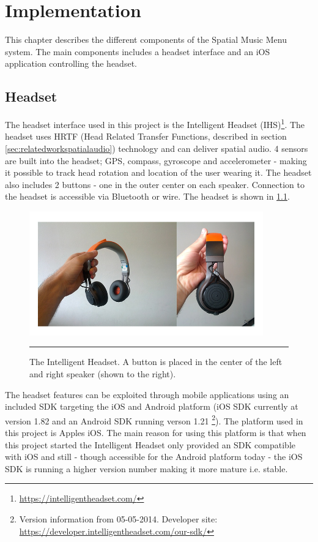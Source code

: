 \chapter{Implementation}
This chapter describes the different components of the Spatial Music Menu system. The main components includes a headset interface and an iOS application controlling the headset.


\section{Headset}
\label{sec:implementationheadset}
The headset interface used in this project is the Intelligent Headset (IHS)\footnote{\url{https://intelligentheadset.com/}}. The headset uses HRTF (Head Related Transfer Functions, described in section \ref{sec:relatedworkspatialaudio}) technology and can deliver spatial audio. 4 sensors are built into the headset; GPS, compass, gyroscope and accelerometer - making it possible to track head rotation and location of the user wearing it. The headset also includes 2 buttons - one in the outer center on each speaker. Connection to the headset is accessible via Bluetooth or wire. The headset is shown in \ref{fig:headset}.

\begin{figure}[h]
	\centering
		\includegraphics[width=0.9\textwidth,height=\textheight,keepaspectratio]{./Figures/headset.jpg}
		\rule{35em}{1pt}
	\caption[The Intelligent Headset]{The Intelligent Headset. A button is placed in the center of the left and right speaker (shown to the right).}
	\label{fig:headset}
\end{figure}

The headset features can be exploited through mobile applications using an included SDK targeting the iOS and Android platform (iOS SDK currently at version 1.82 and an Android SDK running verson 1.21 \footnote{Version information from 05-05-2014. Developer site: \url{https://developer.intelligentheadset.com/our-sdk/}}). The platform used in this project is Apples iOS. The main reason for using this platform is that when this project started the Intelligent Headset only provided an SDK compatible with iOS and still - though accessible for the Android platform today - the iOS SDK is running a higher version number making it more mature i.e. stable.

